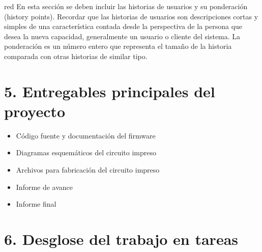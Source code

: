 \documentclass[11pt]{charter}
\begin{document}
\begin{consigna}{red}
En esta sección se deben incluir las historias de usuarios y su ponderación (history points). Recordar que las historias de usuarios son descripciones cortas y simples de una característica contada desde la perspectiva de la persona que desea la nueva capacidad, generalmente un usuario o cliente del sistema. La ponderación es un número entero que representa el tamaño de la historia comparada con otras historias de similar tipo.
\end{consigna}

\section{5. Entregables principales del proyecto}
\label{sec:entregables}

\begin{itemize}
\item Código fuente y documentación del firmware
\item Diagramas esquemáticos del circuito impreso
\item Archivos para fabricación del circuito impreso
\item Informe de avance
\item Informe final
\end{itemize}

\newpage

\section{6. Desglose del trabajo en tareas}
\label{sec:wbs}
\end{document}
